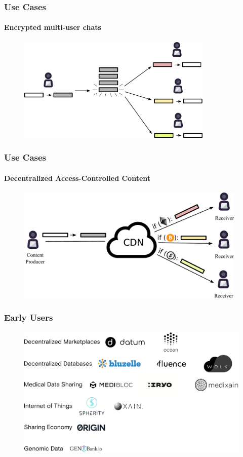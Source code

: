 \documentclass[xetex,mathsans,sans,aspectratio=169]{beamer}
\begin{document}
    \begin{frame}
        \frametitle{Use Cases}
        \framesubtitle{Encrypted multi-user chats}
        \begin{figure}
            \centering
            \includegraphics[height=5cm]{pdf/chats.pdf}
        \end{figure}
    \end{frame}

    \begin{frame}
        \frametitle{Use Cases}
        \framesubtitle{Decentralized Access-Controlled Content}
        \begin{figure}
            \centering
            \includegraphics[height=5.5cm]{pdf/content.pdf}
        \end{figure}
    \end{frame}

    \begin{frame}
      \frametitle{Early Users}
      \begin{figure}
           \includegraphics[width=13cm]{pdf/projects.pdf}
      \end{figure}
    \end{frame}
\end{document}
